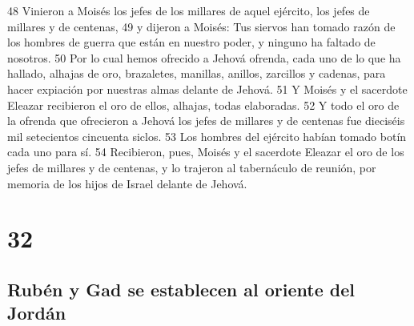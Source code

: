 48 Vinieron a Moisés los jefes de los millares de aquel ejército, los jefes de millares y de centenas,
49 y dijeron a Moisés: Tus siervos han tomado razón de los hombres de guerra que están en nuestro poder, y ninguno ha faltado de nosotros.
50 Por lo cual hemos ofrecido a Jehová ofrenda, cada uno de lo que ha hallado, alhajas de oro, brazaletes, manillas, anillos, zarcillos y cadenas, para hacer expiación por nuestras almas delante de Jehová.
51 Y Moisés y el sacerdote Eleazar recibieron el oro de ellos, alhajas, todas elaboradas.
52 Y todo el oro de la ofrenda que ofrecieron a Jehová los jefes de millares y de centenas fue dieciséis mil setecientos cincuenta siclos.
53 Los hombres del ejército habían tomado botín cada uno para sí.
54 Recibieron, pues, Moisés y el sacerdote Eleazar el oro de los jefes de millares y de centenas, y lo trajeron al tabernáculo de reunión, por memoria de los hijos de Israel delante de Jehová.

\chapter{32}

\section*{Rubén y Gad se establecen al oriente del Jordán }


